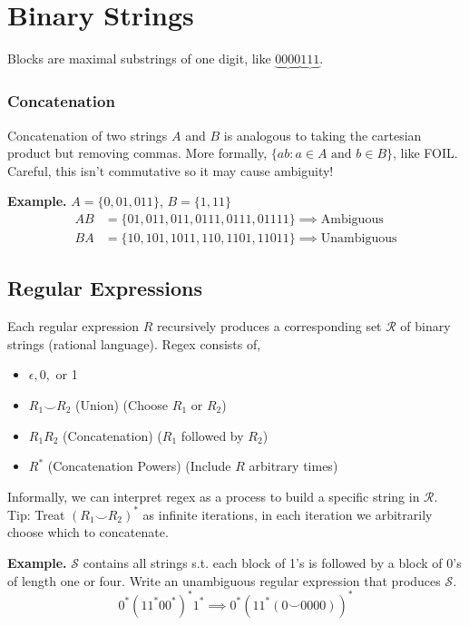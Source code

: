 \documentclass[11pt]{article}
\newenvironment{eg}[1]{
\begin{tcolorbox}[colback = white!15, arc=0pt,outer arc=0pt, colframe = black]
{\color{black} \textbf{Example.} #1} \\[5pt]
}
{
\end{tcolorbox}
}
\newcommand{\nl}{\\[5pt]}
\newcommand{\lstspacing}{\setlength\itemsep{1pt}}
\begin{document}
\newpage
\section{Binary Strings}
Blocks are maximal substrings of one digit, like $\underbrace{0000}\underbrace{111}$. 

\subsubsection{Concatenation}
Concatenation of two strings $A$ and $B$ is analogous to taking the cartesian product but removing commas. More formally, $\{ab : a \in A \text{ and } b \in B\}$, like FOIL. Careful, this isn't commutative so it may cause ambiguity!
\begin{eg}{$A = \{0, 01, 011\}$, $B = \{1, 11\}$}
\vspace{-20pt}
\begin{align*}
    AB &= \{01, 011, 011, 0111, 0111, 01111\} \implies \text{Ambiguous}\\
    BA &= \{10, 101, 1011, 110, 1101, 11011\} \implies \text{Unambiguous}
\end{align*}
\end{eg}
\subsection{Regular Expressions}
Each regular expression $R$ recursively produces a corresponding set $\mathcal{R}$ of binary strings (rational language). Regex consists of, 
\begin{itemize}
\lstspacing
    \item $\epsilon, 0, $ or 1
    \item $R_1 \smile R_2$ (Union) \hfill (Choose $R_1$ or $R_2$)
    \item $R_1R_2$ (Concatenation) \hfill ($R_1$ followed by $R_2$) 
    \item $R^*$ (Concatenation Powers) \hfill (Include $R$ arbitrary times) 
\end{itemize}
Informally, we can interpret regex as a process to build a specific string in $\mathcal{R}$. \nl 
Tip: Treat $(R_1 \smile R_2)^*$ as infinite iterations, in each iteration we arbitrarily choose which to concatenate. 

\begin{eg}{$\mathcal{S}$ contains all strings s.t. each block of 1's is followed by a block of 0's of length one or four. Write an unambiguous regular expression that produces $\mathcal{S}$. }
\vspace{-10pt}
$$0^*(11^*00^*)^*1^* \implies 0^*(11^*(0 \smile 0000))^*$$
\end{eg}
\end{document}
